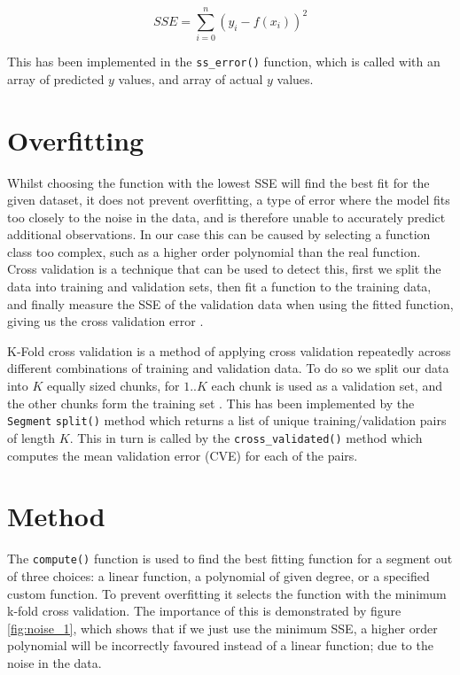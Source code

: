 \documentclass[11pt,a4paper]{scrartcl}
\begin{document}
\[SSE = \sum_{i=0}^{n} ( y_{i} - f(x_{i}) )^{2}\]

This has been implemented in the \lstinline|ss_error()| function, which is called with an array of predicted $y$ values, and array of actual $y$ values.

\section{Overfitting}

Whilst choosing the function with the lowest SSE will find the best fit for the given dataset, it does not prevent overfitting, a type of error where the model fits too closely to the noise in the data, and is therefore unable to accurately predict additional observations. In our case this can be caused by selecting a function class too complex, such as a higher order polynomial than the real function. Cross validation is a technique that can be used to detect this, first we split the data into training and validation sets, then fit a function to the training data, and finally measure the SSE of the validation data when using the fitted function, giving us the cross validation error \cite{lecture_overfitting}.

K-Fold cross validation is a method of applying cross validation repeatedly across different combinations of training and validation data. To do so we split our data into $K$ equally sized chunks, for $1..K$ each chunk is used as a validation set, and the other chunks form the training set \cite{k_fold_validation}. This has been implemented by the \lstinline|Segment| \lstinline|split()| method which returns a list of unique training/validation pairs of length $K$. This in turn is called by the \lstinline|cross_validated()| method which computes the mean validation error (CVE) for each of the pairs.

\section{Method}

The \lstinline|compute()| function is used to find the best fitting function for a segment out of three choices: a linear function, a polynomial of given degree, or a specified custom function. To prevent overfitting it selects the function with the minimum k-fold cross validation. The importance of this is demonstrated by figure \ref{fig:noise_1}, which shows that if we just use the minimum SSE, a higher order polynomial will be incorrectly favoured instead of a linear function; due to the noise in the data.
\end{document}
